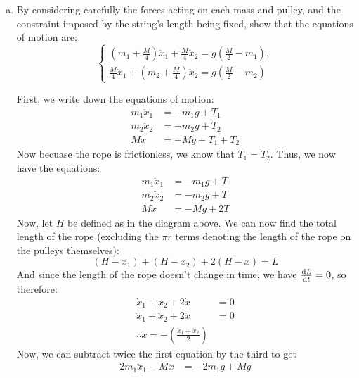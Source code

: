 \documentclass[10pt]{article}
\begin{document}
    \begin{enumerate}[(a)]
        \item By considering carefully the forces acting on each mass and pulley, and the constraint imposed by the string's length being fixed, show that the equations of motion are:
        \[ \begin{cases}
            \left( m_1 + \frac{M}{4}\right) \ddot x_1 + \frac{M}{4} \ddot x_2 = g\left( \frac M2 - m_1\right), \\ 
            \frac M4 \ddot x_1 + \left( m_2 + \frac M4 \right) \ddot x_2 = g\left( \frac {M}{2} - m_2\right)
        \end{cases}\] 

        \begin{solution}
            First, we write down the equations of motion: 
            \begin{align*}
                m_1 \ddot x_1 &= -m_1g + T_1\\
                m_2 \ddot x_2 &= -m_2g + T_2\\
                M\ddot x &= -Mg + T_1 + T_2
            \end{align*}
            Now becuase the rope is frictionless, we know that $T_1 = T_2$. Thus, we now have the equations: 
            \begin{align}
                m_1 \ddot x_1 &= -m_1g + T\\
                m_2 \ddot x_2 &= -m_2g + T\\
                M\ddot x &= -Mg + 2T
            \end{align}
            Now, let $H$ be defined as in the diagram above. We can now find the total length of the rope (excluding the $\pi r$ terms denoting the length of the rope on the pulleys themselves): 
            \[ (H - x_1) + (H - x_2) + 2(H - x) = L\] 
            And since the length of the rope doesn't change in time, we have $\dv{L}{t} = 0$, so therefore: 
            \begin{align*}
                \dot x_1 + \dot x_2 + 2\dot x &= 0\\
                \ddot x_1 + \ddot x_2 + 2 \ddot x &= 0\\
                \therefore \ddot x =-\left( \frac{\ddot x_1 + \ddot x_2}{2}\right)
            \end{align*}
            Now, we can subtract twice the first equation by the third to get
            \begin{align*}
                2m_1 \ddot x_1 - M\ddot x &= -2m_1g + Mg

\end{align*}
\end{solution}
\end{enumerate}
\end{document}
